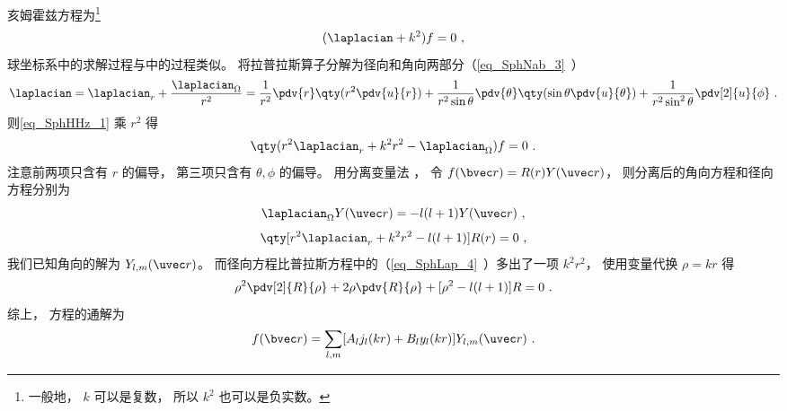 

亥姆霍兹方程为\footnote{一般地， $k$ 可以是复数， 所以 $k^2$ 也可以是负实数。}
\begin{equation}\label{eq_SphHHz_1}
(\laplacian + k^2)f = 0~,
\end{equation}
球坐标系中的求解过程与中的过程类似。 将拉普拉斯算子分解为径向和角向两部分（\autoref{eq_SphNab_3}~）
\begin{equation}
\laplacian = \laplacian_r + \frac{\laplacian_{\Omega}}{r^2} = \frac{1}{r^2} \pdv{r} \qty(r^2 \pdv{u}{r}) + \frac{1}{r^2\sin\theta}\pdv{\theta} \qty(\sin \theta \pdv{u}{\theta}) + \frac{1}{r^2\sin^2 \theta} \pdv[2]{u}{\phi}~.
\end{equation}
则\autoref{eq_SphHHz_1} 乘 $r^2$ 得
\begin{equation}
\qty(r^2\laplacian_r + k^2 r^2 - \laplacian_\Omega) f = 0~.
\end{equation}
注意前两项只含有 $r$ 的偏导， 第三项只含有 $\theta,\phi$ 的偏导。 用分离变量法 %
， 令 $f(\bvec r) = R(r) Y(\uvec r)$， 则分离后的角向方程和径向方程分别为
\begin{equation}
\laplacian_{\Omega} Y(\uvec r) = -l(l+1) Y(\uvec r)~,
\end{equation}
\begin{equation}
\qty[r^2\laplacian_r + k^2 r^2 - l(l+1)] R(r) = 0~,
\end{equation}
我们已知角向的解为 $Y_{l,m}(\uvec r)$。 而径向方程比普拉斯方程中的（\autoref{eq_SphLap_4}~）多出了一项 $k^2r^2$， 使用变量代换 $\rho = kr$ 得
\begin{equation}
\rho^2\pdv[2]{R}{\rho} + 2\rho\pdv{R}{\rho} + [\rho^2 - l(l+1)] R = 0~.
\end{equation}
综上， 方程的通解为
\begin{equation}
f(\bvec r) = \sum_{l,m} [A_l j_l(kr) + B_l y_l(kr)] Y_{l,m}(\uvec r)~.
\end{equation}

